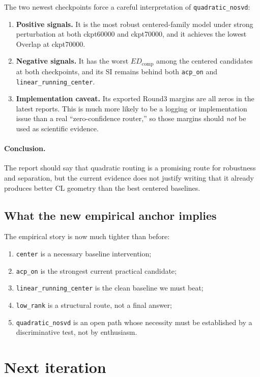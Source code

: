 \documentclass[11pt]{article}
\begin{document}
The two newest checkpoints force a careful interpretation of \texttt{quadratic\_nosvd}:
\begin{enumerate}
    \item \textbf{Positive signals.} It is the most robust centered-family model under strong perturbation at both ckpt60000 and ckpt70000, and it achieves the lowest Overlap at ckpt70000.
    \item \textbf{Negative signals.} It has the worst $ED_{\mathrm{comp}}$ among the centered candidates at both checkpoints, and its SI remains behind both \texttt{acp\_on} and \texttt{linear\_running\_center}.
    \item \textbf{Implementation caveat.} Its exported Round3 margins are all zeros in the latest reports. This is much more likely to be a logging or implementation issue than a real ``zero-confidence router,'' so those margins should \emph{not} be used as scientific evidence.
\end{enumerate}

\paragraph{Conclusion.} The report should say that quadratic routing is a promising route for robustness and separation, but the current evidence does not justify writing that it already produces better CL geometry than the best centered baselines.

\subsection{What the new empirical anchor implies}

The empirical story is now much tighter than before:
\begin{enumerate}
    \item \texttt{center} is a necessary baseline intervention;
    \item \texttt{acp\_on} is the strongest current practical candidate;
    \item \texttt{linear\_running\_center} is the clean baseline we must beat;
    \item \texttt{low\_rank} is a structural route, not a final answer;
    \item \texttt{quadratic\_nosvd} is an open path whose necessity must be established by a discriminative test, not by enthusiasm.
\end{enumerate}

\section{Next iteration}
\end{document}
